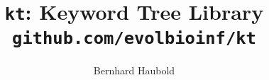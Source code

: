 \documentclass[a4paper]{article}
\begin{document}
\pagestyle{noweb}

\title{\texttt{kt}: Keyword Tree Library\\
\small \texttt{github.com/evolbioinf/kt}}
\author{Bernhard Haubold}
\maketitle
\tableofcontents




\end{document}
